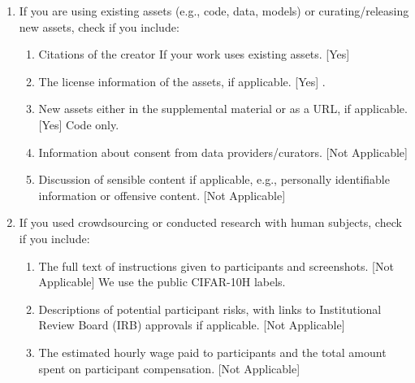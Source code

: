 \begin{enumerate}
  \item If you are using existing assets (e.g., code, data, models) or curating/releasing new assets, check if you include:
  \begin{enumerate}
    \item Citations of the creator If your work uses existing assets. [Yes]
    \item The license information of the assets, if applicable. [Yes] .
    \item New assets either in the supplemental material or as a URL, if applicable. [Yes] Code only.
    \item Information about consent from data providers/curators. [Not Applicable]
    \item Discussion of sensible content if applicable, e.g., personally identifiable information or offensive content. [Not Applicable]
  \end{enumerate}

  \item If you used crowdsourcing or conducted research with human subjects, check if you include:
  \begin{enumerate}
    \item The full text of instructions given to participants and screenshots. [Not Applicable] We use the public CIFAR-10H labels.
    \item Descriptions of potential participant risks, with links to Institutional Review Board (IRB) approvals if applicable. [Not Applicable]
    \item The estimated hourly wage paid to participants and the total amount spent on participant compensation. [Not Applicable]
  \end{enumerate}

\end{enumerate}
